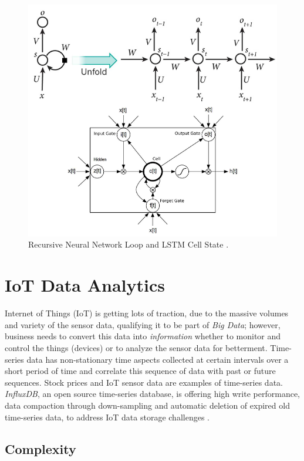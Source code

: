 \documentclass[sigconf]{acmart}
\begin{document}
	\begin{figure}
		\centering
		\includegraphics[width=1.0\columnwidth]{images/rnn}
		\caption{Recursive Neural Network Loop and LSTM Cell State \cite{LeCun2015, Leonard2016}.} \label{fig:figure4} 
	\end{figure}

	
	\section{IoT Data Analytics}
	
	Internet of Things (IoT) is getting lots of traction, due to the massive volumes and variety of the sensor data, qualifying it to be part of {\em Big Data}; however, business needs to convert this data into {\em information} whether to monitor and control the things (devices) or to analyze the sensor data for betterment. Time-series data has non-stationary time aspects collected at certain intervals over a short period of time and correlate this sequence of data with past or future sequences. Stock prices and IoT sensor data are examples of time-series data. {\em InfluxDB}, an open source time-series database, is offering high write performance, data compaction through down-sampling and automatic deletion of expired old time-series data, to address IoT data storage challenges \cite{Influx}.	
	
	
	\subsection{Complexity}
	
\end{document}
